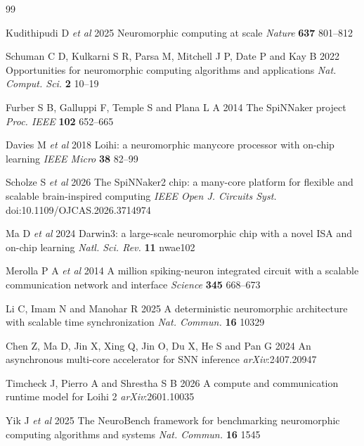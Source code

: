 \documentclass{iopjournal}
\begin{document}

\begin{thebibliography}{99}

 Kudithipudi D \textit{et al} 2025 Neuromorphic computing at scale \textit{Nature} \textbf{637} 801--812

 Schuman C D, Kulkarni S R, Parsa M, Mitchell J P, Date P and Kay B 2022 Opportunities for neuromorphic computing algorithms and applications \textit{Nat. Comput. Sci.} \textbf{2} 10--19

 Furber S B, Galluppi F, Temple S and Plana L A 2014 The SpiNNaker project \textit{Proc. IEEE} \textbf{102} 652--665

 Davies M \textit{et al} 2018 Loihi: a neuromorphic manycore processor with on-chip learning \textit{IEEE Micro} \textbf{38} 82--99

 Scholze S \textit{et al} 2026 The SpiNNaker2 chip: a many-core platform for flexible and scalable brain-inspired computing \textit{IEEE Open J. Circuits Syst.} doi:10.1109/OJCAS.2026.3714974

 Ma D \textit{et al} 2024 Darwin3: a large-scale neuromorphic chip with a novel ISA and on-chip learning \textit{Natl. Sci. Rev.} \textbf{11} nwae102

 Merolla P A \textit{et al} 2014 A million spiking-neuron integrated circuit with a scalable communication network and interface \textit{Science} \textbf{345} 668--673

 Li C, Imam N and Manohar R 2025 A deterministic neuromorphic architecture with scalable time synchronization \textit{Nat. Commun.} \textbf{16} 10329

 Chen Z, Ma D, Jin X, Xing Q, Jin O, Du X, He S and Pan G 2024 An asynchronous multi-core accelerator for SNN inference \textit{arXiv}:2407.20947

 Timcheck J, Pierro A and Shrestha S B 2026 A compute and communication runtime model for Loihi 2 \textit{arXiv}:2601.10035

 Yik J \textit{et al} 2025 The NeuroBench framework for benchmarking neuromorphic computing algorithms and systems \textit{Nat. Commun.} \textbf{16} 1545


\end{thebibliography}
\end{document}
